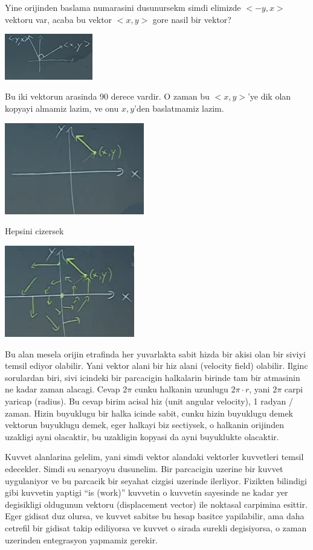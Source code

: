 \documentclass[12pt,fleqn]{article}
\begin{document}
Yine orijinden baslama numarasini dusunursekm simdi elimizde $<-y,x>$
vektoru var, acaba bu vektor $<x,y>$ gore nasil bir vektor? 

\includegraphics[height=2cm]{19_5.png}

Bu iki vektorun arasinda 90 derece vardir. O zaman bu $<x,y>$'ye dik olan
kopyayi almamiz lazim, ve onu $x,y$'den baslatmamiz lazim. 

\includegraphics[height=4cm]{19_6.png}

Hepsini cizersek

\includegraphics[height=4cm]{19_7.png}

Bu alan mesela orijin etrafinda her yuvarlakta sabit hizda bir akisi olan
bir siviyi temsil ediyor olabilir. Yani vektor alani bir hiz alani
(velocity field) olabilir. Ilginc sorulardan biri, sivi icindeki bir
parcacigin halkalarin birinde tam bir atmasinin ne kadar zaman
alacagi. Cevap $2\pi$ cunku halkanin uzunlugu $2\pi \cdot r$, yani $2\pi$
carpi yaricap (radius). Bu cevap birim acisal hiz (unit angular velocity),
1 radyan / zaman. Hizin buyuklugu bir halka icinde sabit, cunku hizin
buyuklugu demek vektorun buyuklugu demek, eger halkayi biz sectiysek, o
halkanin orijinden uzakligi ayni olacaktir, bu uzakligin kopyasi da ayni
buyuklukte olacaktir. 

Kuvvet alanlarina gelelim, yani simdi vektor alandaki vektorler kuvvetleri
temsil edecekler. Simdi su senaryoyu dusunelim. Bir parcacigin uzerine bir
kuvvet uygulaniyor ve bu parcacik bir seyahat cizgisi uzerinde
ilerliyor. Fizikten bilindigi gibi kuvvetin yaptigi ``is (work)'' kuvvetin
o kuvvetin sayesinde ne kadar yer degisikligi oldugunun vektoru
(displacement vector) ile noktasal carpimina esittir. Eger gidisat duz
olursa, ve kuvvet sabitse bu hesap basitce yapilabilir, ama daha cetrefil
bir gidisat takip ediliyorsa ve kuvvet o sirada surekli degisiyorsa, o
zaman uzerinden entegrasyon yapmamiz gerekir.
\end{document}
